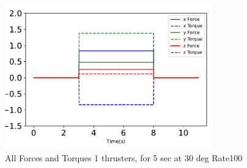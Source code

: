 \begin{figure}[htbp]\centerline{\includegraphics[width=0.8\textwidth]{AutoTeX/1Thrusters_5s_30deg_Loc2_Rate100}}\caption{All Forces and Torques 1 thrusters, for 5 sec at 30 deg Rate100}\label{fig:1Thrusters_5s_30deg_Loc2_Rate100}\end{figure}